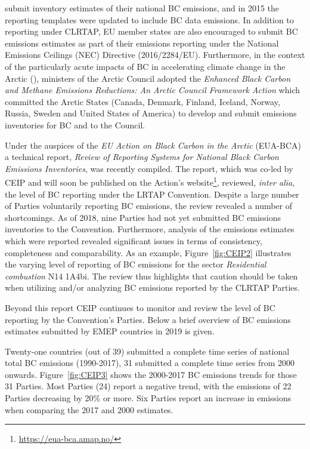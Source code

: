 {submit inventory estimates of their national BC emissions, and in 2015 the reporting templates were updated to include
BC data emissions. In addition to reporting under CLRTAP, EU member states are also encouraged to submit BC emissions
estimates as part of their emissions reporting under the National Emissions Ceilings (NEC) Directive (2016/2284/EU). Furthermore, in the context of the particularly acute impacts of BC in accelerating climate change in the Arctic (\cite{SanBerSal16}), ministers of the Arctic Council adopted the {\it Enhanced Black Carbon and Methane Emissions Reductions: An Arctic Council Framework Action} which committed the Arctic States (Canada, Denmark, Finland, Iceland, Norway, Russia, Sweden and United States of America) to develop and submit emissions inventories for BC and \chiv to the Council.

Under the auspices of the {\it EU Action on Black Carbon in the Arctic} (EUA-BCA) a technical report, {\it Review of Reporting
Systems for National Black Carbon Emissions Inventories}, was recently compiled. The report, which was co-led by CEIP
and will soon be published on the Action's website\footnote{\url{https://eua-bca.amap.no/}}, reviewed, {\it inter alia}, the level
of BC reporting under the LRTAP Convention. Despite a large number of Parties voluntarily reporting BC emissions, the review
revealed a number of shortcomings. As of 2018, nine Parties had not yet submitted BC emissions inventories to the
Convention. Furthermore, analysis of the emissions estimates which were reported revealed significant issues in terms
of consistency, completeness and comparability. As an example, Figure~\ref{fig:CEIP2} illustrates the varying level of reporting of
BC emissions for the sector {\it Residential combustion} N14 1A4bi. The review thus highlights that caution should be taken
when utilizing and/or analyzing BC emissions reported by the CLRTAP Parties.




Beyond this report CEIP continues to monitor and review the level of BC reporting by the Convention's Parties. Below a
brief overview of BC emissions estimates submitted by EMEP countries in 2019 is given.


Twenty-one countries (out of 39) submitted a complete time series of  national total BC emissions (1990-2017), 31 submitted a complete time series from 2000 onwards. Figure~\ref{fig:CEIP3} shows the 2000-2017 BC emissions trends for those 31 Parties. Most Parties (24) report a negative trend, with
the emissions of 22 Parties decreasing by 20\% or more. Six Parties report an increase in emissions when comparing the
2017 and 2000 estimates. 

}
